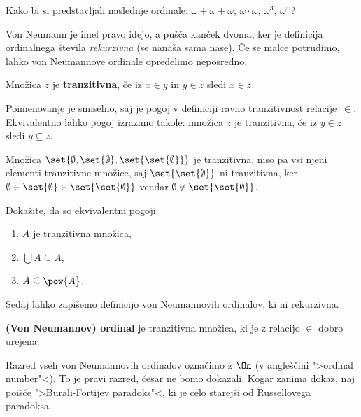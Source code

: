 \begin{vaja}
  Kako bi si predstavljali naslednje ordinale: $\omega + \omega + \omega$, $\omega \cdot \omega$, $\omega^3$, $\omega^\omega$?
\end{vaja}

Von Neumann je imel pravo idejo, a pušča kanček dvoma, ker je definicija ordinalnega števila \emph{rekurzivna} (se nanaša sama nase). Če se malce potrudimo, lahko von Neumannove ordinale opredelimo neposredno.

\begin{definicija}
  Množica $z$ je \textbf{tranzitivna}, če iz $x \in y$ in $y \in z$ sledi $x \in z$.
\end{definicija}

\noindent
%
Poimenovanje je smiselno, saj je pogoj v definiciji ravno tranzitivnost relacije~$\in$.
Ekvivalentno lahko pogoj izrazimo takole: množica $z$ je tranzitivna, če iz $y \in z$ sledi $y \subseteq z$.

\begin{zgled}
  Množica $\set{\emptyset, \set{\emptyset}, \set{\set{\emptyset}}}$ je tranzitivna, niso pa vsi njeni elementi tranzitivne množice, saj $\set{\set{\emptyset}}$ ni tranzitivna, ker $\emptyset \in \set{\emptyset} \in \set{\set{\emptyset}}$ vendar $\emptyset \not\in \set{\set{\emptyset}}$.
\end{zgled}

\begin{vaja}
  Dokažite, da so ekvivalentni pogoji:
  \begin{enumerate}
  \item $A$ je tranzitivna množica,
  \item $\bigcup A \subseteq A$,
  \item $A \subseteq \pow{A}$.
  \end{enumerate}
\end{vaja}

Sedaj lahko zapišemo definicijo von Neumannovih ordinalov, ki ni rekurzivna.

\begin{definicija}
  \label{def:von-neuman-ordinal}
  \textbf{(Von Neumannov) ordinal} je tranzitivna množica, ki je z relacijo $\in$ dobro urejena.
\end{definicija}

Razred vseh von Neumannovih ordinalov označimo z $\On$ (v angleščini ">ordinal number"<). To je pravi razred, česar ne bomo dokazali. Kogar zanima dokaz, naj poišče ">Burali-Fortijev paradoks"<, ki je celo starejši od Russellovega paradoksa.

